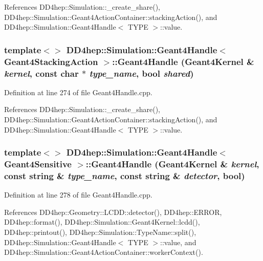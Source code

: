 References DD4hep::Simulation::\_\-create\_\-share(), DD4hep::Simulation::Geant4ActionContainer::stackingAction(), and DD4hep::Simulation::Geant4Handle$<$ TYPE $>$::value.\hypertarget{class_d_d4hep_1_1_simulation_1_1_geant4_handle_ab779480663f611197e91f8e6535dc302}{
\subsubsection[{Geant4Handle}]{\setlength{\rightskip}{0pt plus 5cm}template$<$$>$ {\bf DD4hep::Simulation::Geant4Handle}$<$ {\bf Geant4StackingAction} $>$::{\bf Geant4Handle} ({\bf Geant4Kernel} \& {\em kernel}, \/  const char $\ast$ {\em type\_\-name}, \/  bool {\em shared})}}
\label{class_d_d4hep_1_1_simulation_1_1_geant4_handle_ab779480663f611197e91f8e6535dc302}


Definition at line 274 of file Geant4Handle.cpp.

References DD4hep::Simulation::\_\-create\_\-share(), DD4hep::Simulation::Geant4ActionContainer::stackingAction(), and DD4hep::Simulation::Geant4Handle$<$ TYPE $>$::value.\hypertarget{class_d_d4hep_1_1_simulation_1_1_geant4_handle_af19a8f22d0d51e08e686499cc97de3c4}{
\subsubsection[{Geant4Handle}]{\setlength{\rightskip}{0pt plus 5cm}template$<$$>$ {\bf DD4hep::Simulation::Geant4Handle}$<$ {\bf Geant4Sensitive} $>$::{\bf Geant4Handle} ({\bf Geant4Kernel} \& {\em kernel}, \/  const {\bf string} \& {\em type\_\-name}, \/  const {\bf string} \& {\em detector}, \/  bool)}}
\label{class_d_d4hep_1_1_simulation_1_1_geant4_handle_af19a8f22d0d51e08e686499cc97de3c4}


Definition at line 278 of file Geant4Handle.cpp.

References DD4hep::Geometry::LCDD::detector(), DD4hep::ERROR, DD4hep::format(), DD4hep::Simulation::Geant4Kernel::lcdd(), DD4hep::printout(), DD4hep::Simulation::TypeName::split(), DD4hep::Simulation::Geant4Handle$<$ TYPE $>$::value, and DD4hep::Simulation::Geant4ActionContainer::workerContext().

